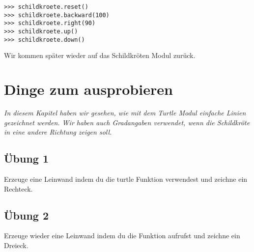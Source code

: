 \begin{Verbatim}[frame=single]
>>> schildkroete.reset()
>>> schildkroete.backward(100)
>>> schildkroete.right(90)
>>> schildkroete.up()
>>> schildkroete.down()
\end{Verbatim}

\noindent
Wir kommen später wieder auf das Schildkröten Modul zurück.

\section{Dinge zum ausprobieren}

\emph{In diesem Kapitel haben wir gesehen, wie mit dem Turtle Modul einfache Linien gezeichnet werden. Wir haben auch Gradangaben verwendet, wenn die Schildkröte in eine andere Richtung zeigen soll.}

\subsection*{Übung 1}
Erzeuge eine Leinwand indem du die turtle Funktion  verwendest und zeichne ein Rechteck.

\subsection*{Übung 2}
Erzeuge wieder eine Leinwand indem du die Funktion  aufrufst und zeichne ein Dreieck.

\newpage
